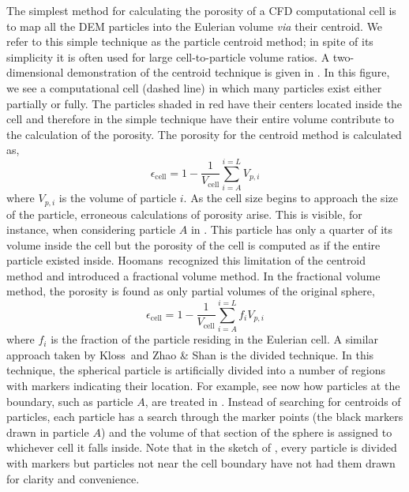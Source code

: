 The simplest method for calculating the porosity of a CFD computational cell is to map all the DEM particles into the Eulerian volume \textit{via} their centroid. We refer to this simple technique as the particle centroid method; in spite of its simplicity it is often used for large cell-to-particle volume ratios.\cite{Xu1997} A two-dimensional demonstration of the centroid technique is given in . In this figure, we see a computational cell (dashed line) in which many particles exist either partially or fully. The particles shaded in red have their centers located inside the cell and therefore in the simple technique have their entire volume contribute to the calculation of the porosity. The porosity for the centroid method is calculated as,
\begin{equation}
	\epsilon_\text{cell} = 1-\frac{1}{V_\text{cell}}\sum_{i = A}^{i=L}V_{p,i}
\end{equation}
where $V_{p,i}$ is the volume of particle $i$. As the cell size begins to approach the size of the particle, erroneous calculations of porosity arise. This is visible, for instance, when considering particle $A$ in . This particle has only a quarter of its volume inside the cell but the porosity of the cell is computed as if the entire particle existed inside. Hoomans\etal~recognized this limitation of the centroid method and introduced a fractional volume method.\cite{Hoomans1996} In the fractional volume method, the porosity is found as only partial volumes of the original sphere,
\begin{equation}
	\epsilon_\text{cell} = 1-\frac{1}{V_\text{cell}}\sum_{i = A}^{i=L}f_iV_{p,i}
\end{equation}
where $f_i$ is the fraction of the particle residing in the Eulerian cell. A similar approach taken by Kloss\etal~and Zhao \& Shan is the divided technique.\cite{Kloss2012,Zhao2013a} In this technique, the spherical particle is artificially divided into a number of regions with markers indicating their location. For example, see now how particles at the boundary, such as particle $A$, are treated in . Instead of searching for centroids of particles, each particle has a search through the marker points (the black markers drawn in particle $A$) and the volume of that section of the sphere is assigned to whichever cell it falls inside. Note that in the sketch of , every particle is divided with markers but particles not near the cell boundary have not had them drawn for clarity and convenience.

